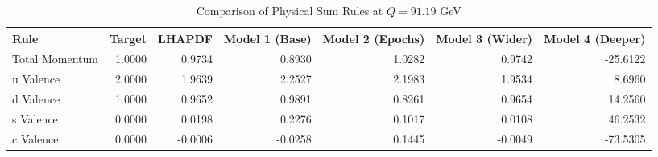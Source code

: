 \begin{table}
\centering
\caption{Comparison of Physical Sum Rules at $Q=91.19$ GeV}
\label{tab:sum_rules_multi_model}
\begin{tabular}{lrrrrrr}
\toprule
          Rule &  Target &  LHAPDF &  Model 1 (Base) &  Model 2 (Epochs) &  Model 3 (Wider) &  Model 4 (Deeper) \\
\midrule
Total Momentum &  1.0000 &  0.9734 &          0.8930 &            1.0282 &            0.9742 &         -25.6122 \\
     u Valence &  2.0000 &  1.9639 &          2.2527 &            2.1983 &            1.9534 &           8.6960 \\
     d Valence &  1.0000 &  0.9652 &          0.9891 &            0.8261 &            0.9654 &          14.2560 \\
     s Valence &  0.0000 &  0.0198 &          0.2276 &            0.1017 &            0.0108 &          46.2532 \\
     c Valence &  0.0000 & -0.0006 &         -0.0258 &            0.1445 &           -0.0049 &         -73.5305 \\
\bottomrule
\end{tabular}
\end{table}
